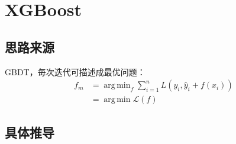 
\section{XGBoost}
\subsection{思路来源}
\begin{frame}
%
%
    GBDT，毎次迭代可描述成最优问题：
    \begin{align*}
        f_m &= \operatorname{arg \, min}_f \sum_{i=1}^n L \left ( y_i, \hat{y}_i + f(x_i) \right ) \\
            &= \operatorname{arg \, min} \mathcal{L}(f)
    \end{align*}
\end{frame}


\subsection{具体推导}

